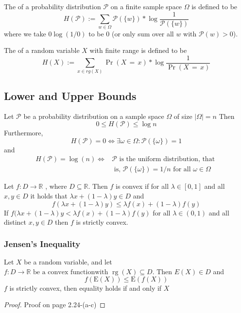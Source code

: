 The  of a probability distribution $\mathcal{P}$ on a finite sample space $\Omega$ is defined to be
\begin{equation*}
H(\mathcal{P}) := \sum_{w \in \Omega}\mathcal{P}(\{w\})* \operatorname{log}\frac{1}{\mathcal{P}(\{w\})}
\end{equation*}
where we take $0 \operatorname{log}(1/0)$ to be 0 (or only sum over all $w$ with $\mathcal{P}(w)>0$).

The  of a random variable $X$ with finite range is defined to be 
\begin{equation*}
H(X) := \sum_{x\in rg(X)}\operatorname{Pr}(X \, = \, x)* \operatorname{log}\frac{1}{\operatorname{Pr}(X \, = \, x)}
\end{equation*}
\subsection{Lower and Upper Bounds}
 Let $\mathcal{P}$ be a probability distribution on a sample space $\Omega$ of size $|\Omega|=n$ Then
 \begin{equation*}
 	0 \leq H(\mathcal{P}) \leq \log n
 \end{equation*}
 Furthermore, 
 \begin{equation*}
	H(\mathcal{P})=0 \Longleftrightarrow \exists \omega \in \Omega : \mathcal{P}(\{\omega\})=1
 \end{equation*}
 and
 \begin{equation*}
 \begin{split} 
 H(\mathcal{P})=\log (n) \Longleftrightarrow & \mathcal{P} \text { is the uniform distribution, that } \\ & \text { is, } \mathcal{P}(\{\omega\})=1 / n \text { for all } \omega \in \Omega 
 \end{split}
 \end{equation*}

  Let $f : D \rightarrow \mathbb{R} $ , where $ D \subseteq \mathbb{R} . $ Then $ f $ is convex if for all $ \lambda \in[0,1] $ and all $ x, y \in D $ it holds that $ \lambda x+(1-\lambda) y \in D $ and 
  \begin{equation*}
  f(\lambda x+(1-\lambda) y) \leq \lambda f(x)+(1-\lambda) f(y)
  \end{equation*} 
If $f(\lambda x+(1-\lambda) y<\lambda f(x)+(1-\lambda) f(y)$ for all $ \lambda \in(0,1)$ and all distinct $ x, y \in D $ then $f$ is strictly convex.
\subsubsection{Jensen's Inequality}
Let $X$ be a random variable, and let $ f : D \rightarrow \mathbb{R} \text { be a convex function} \text {with } \operatorname{rg}(X) \subseteq D . \text { Then } E(X) \in D$ and 
\begin{equation*}
f(\mathrm{E}(X)) \leq \mathrm{E}(f(X))
\end{equation*}
$f$ is strictly convex, then equality holds if and only if $X$
\begin{proof}
	Proof on page 2.24-(a-c)
\end{proof}
